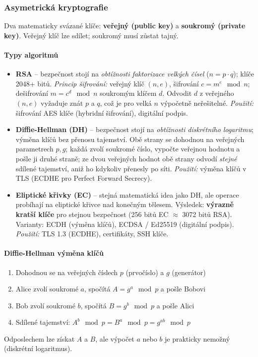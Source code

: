 \subsubsection{Asymetrická kryptografie}

Dva matematicky svázané klíče: \textbf{veřejný (public key)} a \textbf{soukromý (private key)}.
Veřejný klíč lze sdílet; soukromý musí zůstat tajný.

\paragraph{Typy algoritmů}
\begin{itemize}
  \item \textbf{RSA} -- bezpečnost stojí na \textit{obtížnosti faktorizace velkých čísel} ($n = p \cdot q$); klíče 2048+ bitů.
    \textit{Princip šifrování:} veřejný klíč $(n, e)$, šifrování $c = m^e \mod n$; dešifrování $m = c^d \mod n$ soukromým klíčem $d$.
    Odvodit $d$ z veřejného $(n, e)$ vyžaduje znát $p$ a $q$, což je pro velká $n$ výpočetně neřešitelné.
    \textit{Použití:} šifrování AES klíče (hybridní šifrování), digitální podpis.

  \item \textbf{Diffie-Hellman (DH)} -- bezpečnost stojí na \textit{obtížnosti diskrétního logaritmu}; výměna klíčů bez přenosu tajemství.
    Obě strany se dohodnou na veřejných parametrech $p, g$; každá zvolí soukromé číslo, vypočte veřejnou hodnotu a pošle ji druhé straně; ze dvou veřejných hodnot obě strany odvodí \textit{stejné} sdílené tajemství, aniž ho kdykoliv přenesly po síti.
    \textit{Použití:} výměna klíčů v TLS (ECDHE pro Perfect Forward Secrecy).

  \item \textbf{Eliptické křivky (EC)} -- stejná matematická idea jako DH, ale operace probíhají na eliptické křivce nad konečným tělesem.
    Výsledek: \textbf{výrazně kratší klíče} pro stejnou bezpečnost (256 bitů EC $\approx$ 3072 bitů RSA).
    Varianty: ECDH (výměna klíčů), ECDSA / Ed25519 (digitální podpis).
    \textit{Použití:} TLS 1.3 (ECDHE), certifikáty, SSH klíče.
\end{itemize}

\paragraph{Diffie-Hellman výměna klíčů}
\begin{enumerate}
  \item Dohodnou se na veřejných číslech $p$ (prvočíslo) a $g$ (generátor)
  \item Alice zvolí soukromé $a$, spočítá $A = g^a \mod p$ a pošle Bobovi
  \item Bob zvolí soukromé $b$, spočítá $B = g^b \mod p$ a pošle Alici
  \item Sdílené tajemství: $A^b \mod p = B^a \mod p = g^{ab} \mod p$
\end{enumerate}
Odposlechem lze získat $A$ a $B$, ale výpočet $a$ nebo $b$ je prakticky nemožný (diskrétní logaritmus).

